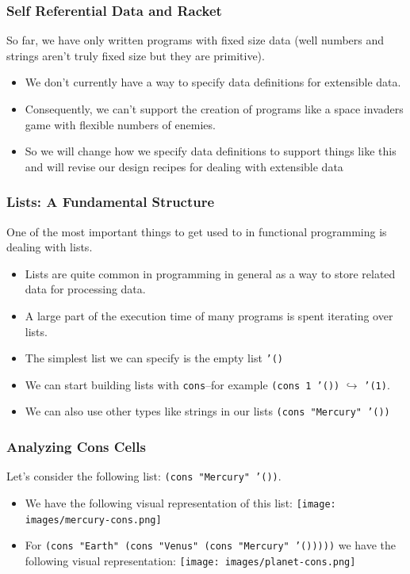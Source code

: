\documentclass{beamer}
\begin{document}
\begin{frame}
  \frametitle{Self Referential Data and Racket}
  So far, we have only written programs with fixed size data (well numbers and strings aren't truly fixed size but they are primitive).
  \begin{itemize}
  \item<2-> We don't currently have a way to specify data definitions for extensible data.
  \item<3-> Consequently, we can't support the creation of programs like a space invaders game with
    flexible numbers of enemies.
  \item<4-> So we will change how we specify data definitions to support things like this and will revise our design recipes
    for dealing with extensible data
  \end{itemize}
\end{frame}

\begin{frame}
  \frametitle{Lists: A Fundamental Structure }
  One of the most important things to get used to in functional programming is dealing with lists.
  \begin{itemize}
  \item<2-> Lists are quite common in programming in general as a way to store related data for processing data.
  \item<3-> A large part of the execution time of many programs is spent iterating over lists.
  \item<4-> The simplest list we can specify is the empty list \texttt{'()}
  \item<5-> We can start building lists with \texttt{cons}--for example
    \texttt{(cons 1 '())} $\hookrightarrow$ \texttt{'(1)}.
  \item<6-> We can also use other types like strings in our lists \texttt{(cons "Mercury" '())}
  \end{itemize}
\end{frame}

\begin{frame}
  \frametitle{Analyzing Cons Cells}
  Let's consider the following list: \texttt{(cons "Mercury" '())}.
  \begin{itemize}
  \item<2-> We have the following visual representation of this list:
    \texttt{[image: images/mercury-cons.png]}
  \item<3-> For \texttt{(cons "Earth" (cons "Venus" (cons "Mercury" '()))))}
    we have the following visual representation:
    \texttt{[image: images/planet-cons.png]}
  \end{itemize}
\end{frame}
\end{document}
